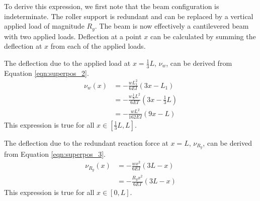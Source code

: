 \documentclass[12 pt]{article}
\begin{document}
To derive this expression, we first note that the beam configuration is indeterminate. The roller support is redundant and can be replaced by a vertical applied load of magnitude $R_y$. The beam is now effectively a cantilevered beam with two applied loads. Deflection at a point $x$ can be calculated by summing the deflection at $x$ from each of the applied loads.

The deflection due to the applied load at $x=\frac{1}{3}L$, $\nu_w$, can be derived from Equation \ref{eqn:superpos_2}.
\begin{align*}
	\nu_w(x)&=-\frac{wL_1^2}{6EI}(3x-L_1)\\
	&=-\frac{w\frac{1}{9}L^2}{6EI}(3x-\frac{1}{3}L)\\
	&=-\frac{wL^2}{162EI}(9x-L)
\end{align*}
This expression is true for all $x\in[\frac{1}{3}L,L]$.

The deflection due to the redundant reaction force at $x=L$, $\nu_{R_y}$, can be derived from Equation \ref{eqn:superpos_3}.
\begin{align*}
	\nu_{R_y}(x)&=-\frac{wx^2}{6EI}(3L-x)\\
	&=-\frac{R_yx^2}{6EI}(3L-x)
\end{align*}
This expression is true for all $x\in[0,L]$.
\end{document}
